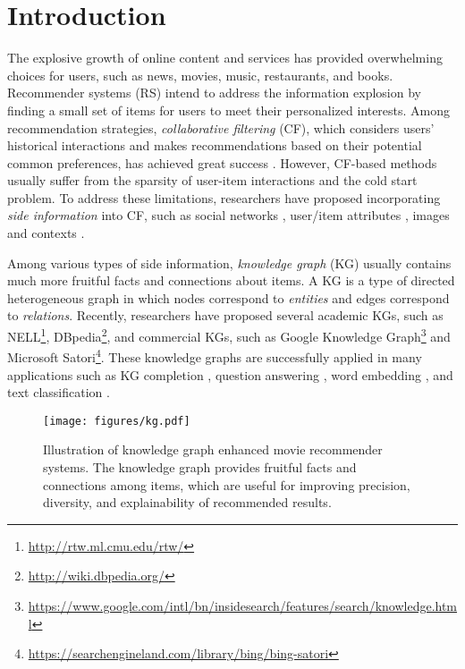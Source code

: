 \documentclass[sigconf]{acmart}
\begin{document}
\section{Introduction}
	The explosive growth of online content and services has provided overwhelming choices for users, such as news, movies, music, restaurants, and books.
	Recommender systems (RS) intend to address the information explosion by finding a small set of items for users to meet their personalized interests.
	Among recommendation strategies, \textit{collaborative filtering} (CF), which considers users' historical interactions and makes recommendations based on their potential common preferences, has achieved great success \cite{koren2009matrix}.
	However, CF-based methods usually suffer from the sparsity of user-item interactions and the cold start problem.
	To address these limitations, researchers have proposed incorporating \textit{side information} into CF, such as social networks \cite{jamali2010matrix}, user/item attributes \cite{wang2018shine}, images \cite{zhang2016collaborative} and contexts \cite{sun2017collaborative}.
	
	Among various types of side information, \textit{knowledge graph} (KG) usually contains much more fruitful facts and connections about items.
	A KG is a type of directed heterogeneous graph in which nodes correspond to \textit{entities} and edges correspond to \textit{relations}.
	Recently, researchers have proposed several academic KGs, such as NELL\footnote{\url{http://rtw.ml.cmu.edu/rtw/}}, DBpedia\footnote{\url{http://wiki.dbpedia.org/}}, and commercial KGs, such as Google Knowledge Graph\footnote{\url{https://www.google.com/intl/bn/insidesearch/features/search/knowledge.html}} and Microsoft Satori\footnote{\url{https://searchengineland.com/library/bing/bing-satori}}.
	These knowledge graphs are successfully applied in many applications such as KG completion \cite{lin2015learning}, question answering \cite{dong2015question}, word embedding \cite{xu2014rc}, and text classification \cite{wang2017combining}.
	
	\begin{figure}[t]
		\centering
  		\texttt{[image: figures/kg.pdf]}
  		\caption{Illustration of knowledge graph enhanced movie recommender systems. The knowledge graph provides fruitful facts and connections among items, which are useful for improving precision, diversity, and explainability of recommended results.}
  		\label{fig:kg}
	\end{figure}
	
\end{document}
